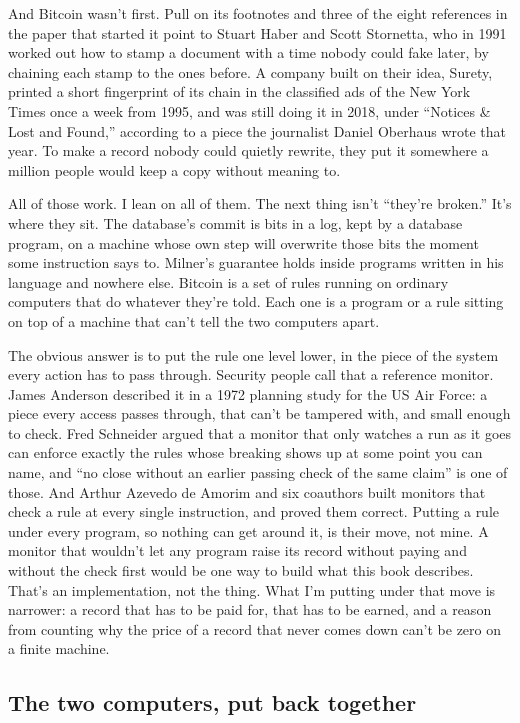 \documentclass[11pt,twoside]{article}
\theoremstyle{thielethm}
\theoremstyle{thieledef}
\theoremstyle{thieledef}
\theoremstyle{thieledef}
\theoremstyle{thielethm}
\theoremstyle{thieleobs}
\theoremstyle{thielethm}
\begin{document}
And Bitcoin wasn't first. Pull on its footnotes and three of the eight references in the paper that started it point to Stuart Haber and Scott Stornetta, who in 1991 worked out how to stamp a document with a time nobody could fake later, by chaining each stamp to the ones before. A company built on their idea, Surety, printed a short fingerprint of its chain in the classified ads of the New York Times once a week from 1995, and was still doing it in 2018, under ``Notices \& Lost and Found,'' according to a piece the journalist Daniel Oberhaus wrote that year. To make a record nobody could quietly rewrite, they put it somewhere a million people would keep a copy without meaning to.

All of those work. I lean on all of them. The next thing isn't ``they're broken.'' It's where they sit. The database's commit is bits in a log, kept by a database program, on a machine whose own step will overwrite those bits the moment some instruction says to. Milner's guarantee holds inside programs written in his language and nowhere else. Bitcoin is a set of rules running on ordinary computers that do whatever they're told. Each one is a program or a rule sitting on top of a machine that can't tell the two computers apart.

The obvious answer is to put the rule one level lower, in the piece of the system every action has to pass through. Security people call that a reference monitor. James Anderson described it in a 1972 planning study for the US Air Force: a piece every access passes through, that can't be tampered with, and small enough to check. Fred Schneider argued that a monitor that only watches a run as it goes can enforce exactly the rules whose breaking shows up at some point you can name, and ``no close without an earlier passing check of the same claim'' is one of those. And Arthur Azevedo de Amorim and six coauthors built monitors that check a rule at every single instruction, and proved them correct. Putting a rule under every program, so nothing can get around it, is their move, not mine. A monitor that wouldn't let any program raise its record without paying and without the check first would be one way to build what this book describes. That's an implementation, not the thing. What I'm putting under that move is narrower: a record that has to be paid for, that has to be earned, and a reason from counting why the price of a record that never comes down can't be zero on a finite machine.

\subsection{The two computers, put back together}
\end{document}
